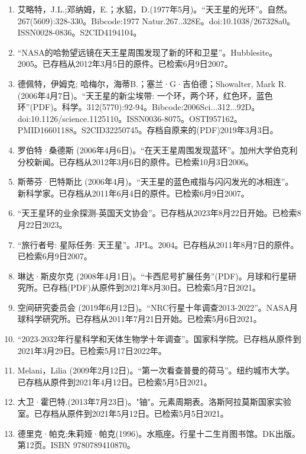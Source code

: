 \begin{enumerate}
\item 艾略特，J.L.;邓纳姆，E.；水貂，D.(1977年5月)。“天王星的光环”。自然。267(5609):328-330。Bibcode:1977 Natur.267..328E。doi:10.1038/267328a0。ISSN0028-0836。S2CID4194104。   
\item “NASA的哈勃望远镜在天王星周围发现了新的环和卫星”。Hubblesite。2005。已存档从2012年3月5日的原件。已检索6月9日2007。
\item 德佩特，伊姆克; 哈梅尔，海蒂B.；塞兰·G·吉伯德；Showalter, Mark R.(2006年4月7日)。“天王星的新尘埃带: 一个环，两个环，红色环，蓝色环”(PDF)。科学。312(5770):92-94。Bibcode:2006Sci...312...92D。doi:10.1126/science.1125110。ISSN0036-8075。OSTI957162。PMID16601188。S2CID32250745。存档自原来的(PDF)2019年3月3日。     
\item 罗伯特·桑德斯 (2006年4月6日)。“在天王星周围发现蓝环”。加州大学伯克利分校新闻。已存档从2012年3月6日的原件。已检索10月3日2006。
\item 斯蒂芬·巴特斯比 (2006年4月)。“天王星的蓝色戒指与闪闪发光的冰相连”。新科学家。已存档从2011年6月4日的原件。已检索6月9日2007。
\item “天王星环的业余探测-英国天文协会”。已存档从2023年8月22日开始。已检索8月22日2023。
\item “旅行者号: 星际任务: 天王星”。JPL。2004。已存档从2011年8月7日的原件。已检索6月9日2007。
\item 琳达·斯皮尔克 (2008年4月1日)。“卡西尼号扩展任务”(PDF)。月球和行星研究所。已存档(PDF)从原件到2021年8月30日。已检索5月7日2021。
\item 空间研究委员会 (2019年6月12日)。“NRC行星十年调查2013-2022”。NASA月球科学研究所。已存档从2011年7月21日开始。已检索5月6日2021。
\item “2023-2032年行星科学和天体生物学十年调查”。国家科学院。已存档从原件到2021年3月29日。已检索5月17日2022年。
\item Melani，Lilia (2009年2月12日)。“第一次看查普曼的荷马”。纽约城市大学。已存档从原件到2021年4月12日。已检索5月5日2021。
\item 大卫·霍巴特.(2013年7月23日)。"铀"。元素周期表。洛斯阿拉莫斯国家实验室。已存档从原件到2021年5月12日。已检索5月5日2021。
\item 德里克·帕克;朱莉娅·帕克(1996)。水瓶座。行星十二生肖图书馆。DK出版。第12页。ISBN 9780789410870。
\end{enumerate}









